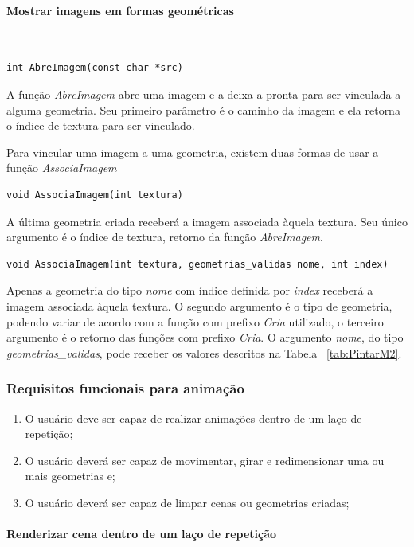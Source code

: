 \newpage
\paragraph{Mostrar imagens em formas geométricas}\mbox{}\\

\begin{lstlisting}
int AbreImagem(const char *src)
\end{lstlisting}

A função \emph{AbreImagem} abre uma imagem e a deixa-a pronta para ser vinculada a alguma geometria. Seu primeiro parâmetro é o caminho da imagem e ela retorna o índice de textura para ser vinculado.

Para vincular uma imagem a uma geometria, existem duas formas de usar a função \emph{AssociaImagem}
\begin{lstlisting}
void AssociaImagem(int textura)
\end{lstlisting}
A última geometria criada receberá a imagem associada àquela textura. Seu único argumento é o índice de textura, retorno da função \emph{AbreImagem}.


\begin{lstlisting}
void AssociaImagem(int textura, geometrias_validas nome, int index)
\end{lstlisting}
Apenas a geometria do tipo \emph{nome} com índice definida por \emph{index} receberá a imagem associada àquela textura. O segundo argumento é o tipo de geometria, podendo variar de acordo com a função com prefixo \emph{Cria} utilizado, o terceiro argumento é o retorno das funções com prefixo \emph{Cria}. 
O argumento \emph{nome}, do tipo \emph{geometrias\_validas}, pode receber os valores descritos na Tabela ~\ref{tab:PintarM2}.

 \subsubsection{Requisitos funcionais para animação}
 \begin{enumerate}
 \item O usuário deve ser capaz de realizar animações dentro de um laço de repetição;
 \item O usuário deverá ser capaz de movimentar, girar e redimensionar uma ou mais geometrias e;
 \item O usuário deverá ser capaz de limpar cenas ou geometrias criadas;
 \end{enumerate}

 \paragraph{Renderizar cena dentro de um laço de repetição}\mbox{}\\

